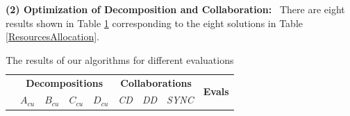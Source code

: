 \begin{table}[!htb]
\begin{tabular}{|c|c|c|c|c|c|c|c|c|}
\hline
\end{tabular}
\end{table}


\textbf{(2) Optimization of Decomposition and Collaboration:} \
There are eight results shown in Table \ref{Evaluations} corresponding to the eight solutions in Table \ref{ResourcesAllocation}.

\begin{table}[!htb]
\centering
\small
\caption{\label{Evaluations}The results of our algorithms for different evaluations}
\begin{tabular}{|c|c|c|c|c|c|c|c|c|}
\hline
\multirow{2}{*}{} &
\multicolumn{4}{|c|}{\textbf{Decompositions}} & \multicolumn{3}{|c|}{\textbf{Collaborations}} &
\multirow{2}{*}{\textbf{Evals}} \\
\cline{2-8}
   &$A_{cu}$ &$B_{cu}$ &$C_{cu}$ &$D_{cu}$ &\emph{ CD } &\emph{ DD } &\emph{SYNC} \\


\end{tabular}
\end{table}
